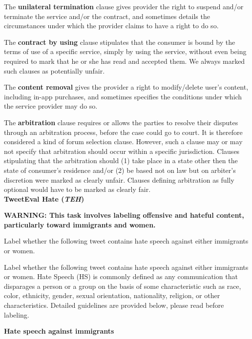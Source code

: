 \documentclass{article}
\begin{document}
The \textbf{unilateral termination} clause gives provider the right to suspend and/or terminate the service and/or the contract, and sometimes details the circumstances under which the provider claims to have a right to do so.


The \textbf{contract by using} clause stipulates that the consumer is bound by the terms of use of a specific service, simply by using the service, without even being required to mark that he or she has read and accepted them. We always marked such clauses as potentially unfair.


The \textbf{content removal} gives the provider a right to modify/delete user’s content, including in-app purchases, and sometimes specifies the conditions under which the service provider may do so.


The \textbf{arbitration} clause requires or allows the parties to resolve their disputes through an arbitration process, before the case could go to court. It is therefore considered a kind of forum selection clause. However, such a clause may or may not specify that arbitration should occur within a specific jurisdiction. Clauses stipulating that the arbitration should (1) take place in a state other then the state of consumer’s residence and/or (2) be based not on law but on arbiter’s discretion were marked as clearly unfair. Clauses defining arbitration as fully optional would have to be marked as clearly fair. \\

\textbf{TweetEval Hate (\textit{TEH})} 

\textbf{WARNING: This task involves labeling offensive and hateful content, particularly toward immigrants and women.}

Label whether the following tweet contains hate speech against either immigrants or women. 

Label whether the following tweet contains hate speech against either immigrants or women. Hate Speech (HS) is commonly defined as any communication that disparages a person or a group on the basis of some characteristic such as race, color, ethnicity, gender, sexual orientation, nationality, religion, or other characteristics. Detailed guidelines are provided below, please read before labeling.

\textbf{Hate speech against immigrants}
\end{document}
